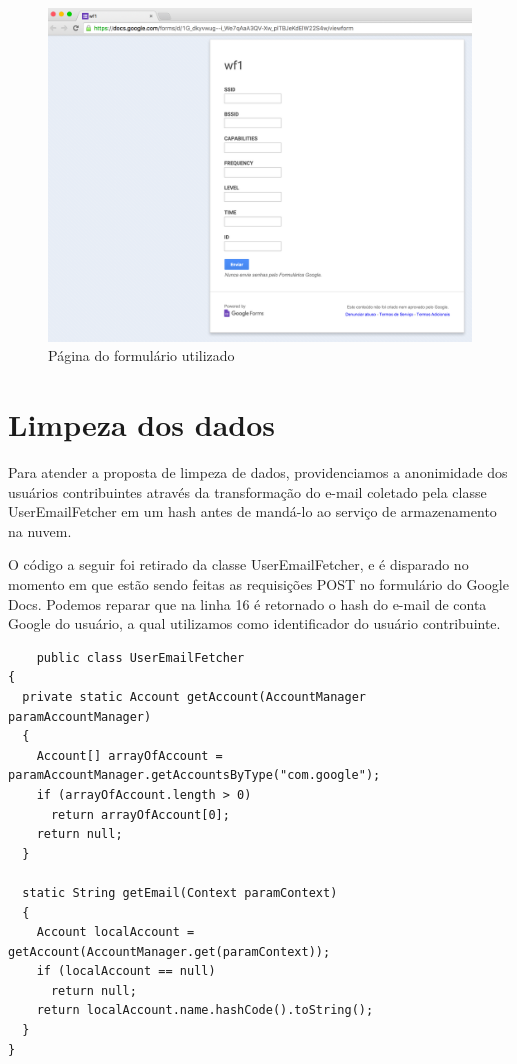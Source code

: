 \documentclass[12pt, %
openright, 
oneside,
a4paper,
brazil]{facom-ufu-abntex2}
\begin{document}
 
\begin{figure}[hbt]
  \includegraphics[scale=0.4]{form}
  \caption{Página do formulário utilizado}
\end{figure}


\section{Limpeza dos dados}
Para atender a proposta de limpeza de dados, providenciamos a anonimidade dos usuários contribuintes através da transformação do e-mail coletado pela classe UserEmailFetcher em um hash antes de mandá-lo ao serviço de armazenamento na nuvem.

O código a seguir foi retirado da classe UserEmailFetcher, e é disparado no momento em que estão sendo feitas as requisições POST no formulário do Google Docs. Podemos reparar que na linha 16 é retornado o hash do e-mail de conta Google do usuário, a qual utilizamos como identificador do usuário contribuinte.



\begin{lstlisting}
	public class UserEmailFetcher
{
  private static Account getAccount(AccountManager paramAccountManager)
  {
    Account[] arrayOfAccount = paramAccountManager.getAccountsByType("com.google");
    if (arrayOfAccount.length > 0)
      return arrayOfAccount[0];
    return null;
  }

  static String getEmail(Context paramContext)
  {
    Account localAccount = getAccount(AccountManager.get(paramContext));
    if (localAccount == null)
      return null;
    return localAccount.name.hashCode().toString();
  }
}
\end{lstlisting}
\end{document}
